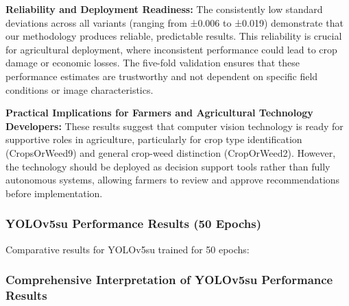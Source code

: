 \textbf{Reliability and Deployment Readiness:} The consistently low standard deviations across all variants (ranging from ±0.006 to ±0.019) demonstrate that our methodology produces reliable, predictable results. This reliability is crucial for agricultural deployment, where inconsistent performance could lead to crop damage or economic losses. The five-fold validation ensures that these performance estimates are trustworthy and not dependent on specific field conditions or image characteristics.

\textbf{Practical Implications for Farmers and Agricultural Technology Developers:} These results suggest that computer vision technology is ready for supportive roles in agriculture, particularly for crop type identification (CropsOrWeed9) and general crop-weed distinction (CropOrWeed2). However, the technology should be deployed as decision support tools rather than fully autonomous systems, allowing farmers to review and approve recommendations before implementation.

\subsubsection{YOLOv5su Performance Results (50 Epochs)}

Comparative results for YOLOv5su trained for 50 epochs:

\begin{table}[H]
\centering
\caption{YOLOv5su Performance Results - 50 Epochs (mAP50-95)}
\label{tab:yolov5su_50_results}
\end{table}

\subsubsection{Comprehensive Interpretation of YOLOv5su Performance Results}

